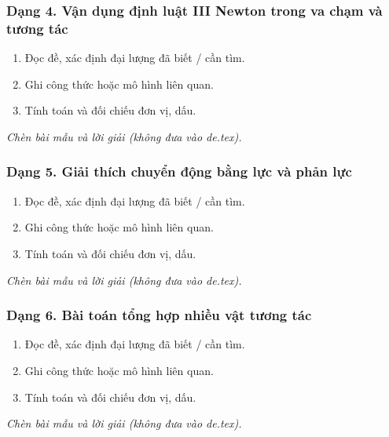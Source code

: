 \subsubsection{Dạng 4. Vận dụng định luật III Newton trong va chạm và tương tác}
\begin{phuongphap}
\begin{enumerate}
\item Đọc đề, xác định đại lượng đã biết / cần tìm.
\item Ghi công thức hoặc mô hình liên quan.
\item Tính toán và đối chiếu đơn vị, dấu.
\end{enumerate}
\end{phuongphap}
\begin{vidumau}
\textit{Chèn bài mẫu và lời giải (không đưa vào de.tex).}
\end{vidumau}

\subsubsection{Dạng 5. Giải thích chuyển động bằng lực và phản lực}
\begin{phuongphap}
\begin{enumerate}
\item Đọc đề, xác định đại lượng đã biết / cần tìm.
\item Ghi công thức hoặc mô hình liên quan.
\item Tính toán và đối chiếu đơn vị, dấu.
\end{enumerate}
\end{phuongphap}
\begin{vidumau}
\textit{Chèn bài mẫu và lời giải (không đưa vào de.tex).}
\end{vidumau}

\subsubsection{Dạng 6. Bài toán tổng hợp nhiều vật tương tác}
\begin{phuongphap}
\begin{enumerate}
\item Đọc đề, xác định đại lượng đã biết / cần tìm.
\item Ghi công thức hoặc mô hình liên quan.
\item Tính toán và đối chiếu đơn vị, dấu.
\end{enumerate}
\end{phuongphap}
\begin{vidumau}
\textit{Chèn bài mẫu và lời giải (không đưa vào de.tex).}
\end{vidumau}

